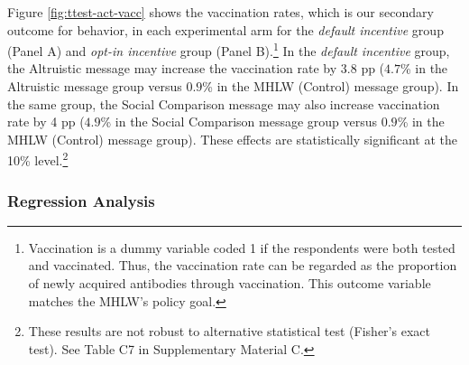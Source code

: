 \documentclass[
      12pt,
    a4paper
]{article}
\begin{document}
Figure \ref{fig:ttest-act-vacc} shows the vaccination rates, which is our secondary outcome for behavior, in each experimental arm for the \emph{default incentive} group (Panel A) and \emph{opt-in incentive} group (Panel B).\footnote{Vaccination is a dummy variable coded 1 if the respondents were both tested and vaccinated. Thus, the vaccination rate can be regarded as the proportion of newly acquired antibodies through vaccination. This outcome variable matches the MHLW's policy goal.} In the \emph{default incentive} group, the Altruistic message may increase the vaccination rate by \(3.8\) pp (\(4.7\)\% in the Altruistic message group versus \(0.9\)\% in the MHLW (Control) message group). In the same group, the Social Comparison message may also increase vaccination rate by 4 pp (\(4.9\)\% in the Social Comparison message group versus \(0.9\)\% in the MHLW (Control) message group). These effects are statistically significant at the 10\% level.\footnote{These results are not robust to alternative statistical test (Fisher's exact test). See Table C7 in Supplementary Material C.}

\hypertarget{regression-analysis-1}{%
\subsubsection{Regression Analysis}\label{regression-analysis-1}}
\end{document}
